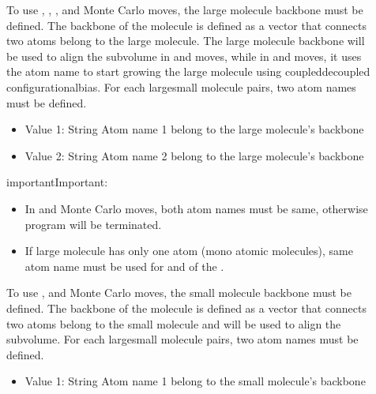 \documentclass[letterpaper,10pt,english]{sphinxmanual}
\begin{document}
\begin{description}
\item[{}] \leavevmode
To use , , , and  Monte Carlo moves, the large molecule backbone must be defined. The backbone of the molecule is defined as a vector that connects two atoms belong to the large molecule.
The large molecule backbone will be used to align the sub\sphinxhyphen{}volume in  and  moves, while in  and  moves, it uses the atom name to start growing the large molecule using coupled\sphinxhyphen{}decoupled configurational\sphinxhyphen{}bias.
For each large\sphinxhyphen{}small molecule pairs, two atom names must be defined.
\begin{itemize}
\item {} 
Value 1: String \sphinxhyphen{} Atom name 1 belong to the large molecule’s backbone

\item {} 
Value 2: String \sphinxhyphen{} Atom name 2 belong to the large molecule’s backbone

\end{itemize}

\begin{sphinxadmonition}{important}{Important:}\begin{itemize}
\item {} 
In  and  Monte Carlo moves, both atom names must be same, otherwise program will be terminated.

\item {} 
If large molecule has only one atom (mono atomic molecules), same atom name must be used for  and  of the .

\end{itemize}
\end{sphinxadmonition}

\item[{}] \leavevmode
To use , and  Monte Carlo moves, the small molecule backbone must be defined. The backbone of the molecule is defined as a vector that connects two atoms belong to the small molecule and will be used to align the sub\sphinxhyphen{}volume.
For each large\sphinxhyphen{}small molecule pairs, two atom names must be defined.
\begin{itemize}
\item {} 
Value 1: String \sphinxhyphen{} Atom name 1 belong to the small molecule’s backbone


\end{itemize}
\end{description}
\end{document}
